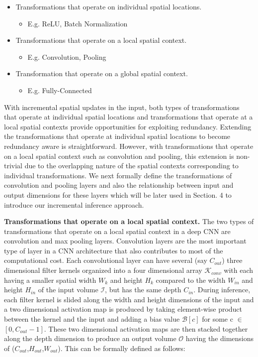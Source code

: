 \begin{itemize}
	\item Transformations that operate on individual spatial locations.
	\begin{itemize}
	 \item E.g. ReLU, Batch Normalization
	\end{itemize}
	\item Transformations that operate on a local spatial context.
	\begin{itemize}
	 \item E.g. Convolution, Pooling
	\end{itemize}
	\item Transformation that operate on a global spatial context.
	\begin{itemize}
	 \item E.g. Fully-Connected
	\end{itemize}
\end{itemize}

With incremental spatial updates in the input, both types of transformations that operate at individual spatial locations and transformations that operate at a local spatial contexts provide opportunities for exploiting redundancy. Extending the transformations that operate at individual spatial locations to become redundancy aware is straightforward. However, with transformations that operate on a local spatial context such as convolution and pooling, this extension is non-trivial due to the overlapping nature of the spatial contexts corresponding to individual transformations. We next formally define the transformations of convolution and pooling layers and also the relationship between input and output dimensions for these layers which will be later used in Section. 4 to introduce our incremental inference approach.


\vspace{2mm}
\noindent \textbf{Transformations that operate on a local spatial context.} The two types of transformations that operate on a local spatial context in a deep CNN are convolution and max pooling layers. Convolution layers are the most important type of layer in a CNN architecture that also contributes to most of the computational cost. Each convolutional layer can have several (say $C_{out}$) three dimensional filter kernels organized into a four dimensional array $\mathcal{K}_{conv}$ with each having a smaller spatial width $W_k$ and height $H_k$ compared to the width $W_{in}$ and height $H_{in}$ of the input volume $\mathcal{I}$, but has the same depth $C_{in}$. During inference, each filter kernel is slided along the width and height dimensions of the input and a two dimensional activation map is produced by taking element-wise product between the kernel and the input and adding a bias value $\mathcal{B}[c]$ for some c $\in$ $[0, C_{out}-1]$. These two dimensional activation maps are then stacked together along the depth dimension to produce an output volume $\mathcal{O}$ having the dimensions of ($C_{out}$,$H_{out}$,$W_{out}$). This can be formally defined as follows:


